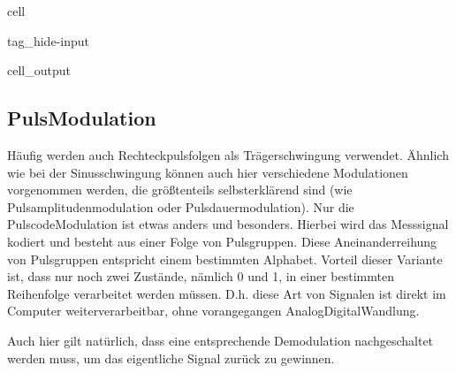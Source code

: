 \documentclass[letterpaper,10pt,english]{jupyterBook}
\begin{document}
\begin{sphinxuseclass}{cell}
\begin{sphinxuseclass}{tag_hide-input}\begin{sphinxVerbatimOutput}

\begin{sphinxuseclass}{cell_output}
\noindent{}

\end{sphinxuseclass}\end{sphinxVerbatimOutput}

\end{sphinxuseclass}
\end{sphinxuseclass}

\subsection{Puls\sphinxhyphen{}Modulation}
\label{\detokenize{content/3_Modulationen:puls-modulation}}
\sphinxAtStartPar
Häufig werden auch Rechteckpulsfolgen als Trägerschwingung verwendet. Ähnlich wie bei der Sinusschwingung können auch hier verschiedene Modulationen vorgenommen werden, die größtenteils selbsterklärend sind (wie Pulsamplitudenmodulation oder Pulsdauermodulation). Nur die Pulscode\sphinxhyphen{}Modulation ist etwas anders und besonders. Hierbei wird das Messsignal kodiert und besteht aus einer Folge von Pulsgruppen. Diese Aneinanderreihung von Pulsgruppen entspricht einem bestimmten Alphabet. Vorteil dieser Variante ist, dass nur noch zwei Zustände, nämlich 0 und 1, in einer bestimmten Reihenfolge verarbeitet werden müssen. D.h. diese Art von Signalen ist direkt im Computer weiterverarbeitbar, ohne vorangegangen Analog\sphinxhyphen{}Digital\sphinxhyphen{}Wandlung.

\sphinxAtStartPar
Auch hier gilt natürlich, dass eine entsprechende Demodulation nachgeschaltet werden muss, um das eigentliche Signal zurück zu gewinnen.

\sphinxAtStartPar
{}
\end{document}

